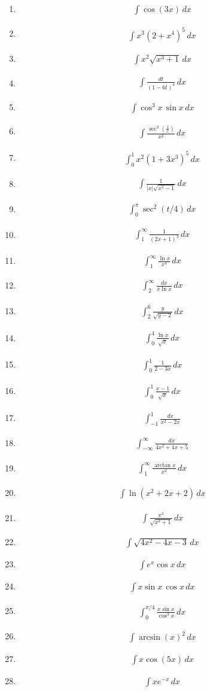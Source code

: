 \documentclass[twoside, fleqn,12pt,letterpaper]{book}
\newcommand{\makeitem}[2]{\item {#2}\begin{align*} {#1}
  \end{align*}}
\newcommand{\makeitemtextb}[1]{\makeitem{{#1}}{\cite{RosTextbook}}}
\begin{document}
\begin{multicols}{2}
\begin{enumerate}
  \makeitemtextb{\int \cos(3x) \, dx}
  
  \makeitemtextb{ \int x^3(2+x^4)^5 \, dx}
  
  \makeitemtextb{ \int x^2\sqrt{x^3+1} \, dx}
  
  \makeitemtextb{\int\frac{dt}{(1-6t)^4} \, dx}
  
 \makeitemtextb{\int \cos^3 x\,\sin x \, dx}
  
  \makeitemtextb{\int\frac{\sec^2\left(\frac{1}{x}\right)}{x^2} \, dx}
  
  \makeitemtextb{\int_{0}^{1} x^2(1+3x^3)^5 \, dx}
  
  \makeitemtextb{\int \frac{1}{|x|\sqrt{x^2-1}} \, dx}
  
  \makeitemtextb{\int_{0}^{\pi}\sec^2(t/4) \, dx}
  
  \makeitemtextb{\int_{1}^{\infty}\frac{1}{(2x+1)^3} \, dx}
  
  \makeitemtextb{\int_{1}^{\infty}\frac{\ln x}{x^4} \, dx}
   
  \makeitemtextb{\int_{2}^{\infty}\frac{dx}{x\ln x} \, dx}
  
  \makeitemtextb {\int_{2}^{6}\frac{y}{\sqrt{y-2}} \, dx}
  
  \makeitemtextb {\int_{0}^{4}\frac{\ln x}{\sqrt{x}} \, dx}
  
  \makeitemtextb {\int_{0}^{1}\frac{1}{2-3x} \, dx}
  
  \makeitemtextb {\int_{0}^{1}\frac{x-1}{\sqrt{x}} \, dx}
  
  \makeitemtextb {\int_{-1}^{1}\frac{dx}{x^2-2x}}
  
  \makeitemtextb {\int_{-\infty}^{\infty}\frac{dx}{4x^2+4x+5}}
  
  \makeitemtextb {\int_{1}^{\infty}\frac{\arctan x}{x^2} \, dx}
  
  \makeitemtextb {\int \ln(x^2+2x+2) \, dx}
  
  \makeitemtextb {\int\frac{x^3}{\sqrt{x^2+1}} \, dx}
  
  \makeitemtextb {\int \sqrt{4x^2-4x-3} \, dx}
  
  \makeitemtextb {\int e^{x}\cos x \, dx}
  
  \makeitemtextb {\int x\sin x\,\cos x \, dx}
  
  \makeitemtextb {\int_{0}^{\pi/4}\frac{x\sin x}{\cos^3 x} \, dx }
  
  \makeitemtextb {\int \arcsin(x)^2 \, dx}
  
  \makeitemtextb {\int x\cos(5x) \, dx}
  
  \makeitemtextb {\int xe^{-x} \, dx}
  

\end{enumerate}
\end{multicols}
\end{document}
